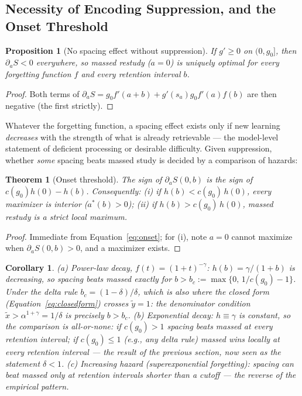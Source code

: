 \documentclass[man, 12pt, floatsintext]{apa6}
\newtheorem{theorem}{Theorem}
\newtheorem{proposition}{Proposition}
\newtheorem{corollary}{Corollary}
\theoremstyle{definition}
\theoremstyle{remark}
\begin{document}
\subsection{Necessity of Encoding Suppression, and the Onset Threshold}

\begin{proposition}[No spacing effect without suppression]\label{prop:suppression}
If $g' \geq 0$ on $(0, g_0]$, then $\partial_a S < 0$ everywhere, so massed restudy ($a=0$) is uniquely optimal for every forgetting function $f$ and every retention interval $b$.
\end{proposition}

\begin{proof}
Both terms of $\partial_a S = g_0 f'(a+b) + g'(s_a) g_0 f'(a) f(b)$ are then negative (the first strictly).
\end{proof}

Whatever the forgetting function, a spacing effect exists only if new learning \emph{decreases} with the strength of what is already retrievable --- the model-level statement of deficient processing or desirable difficulty. Given suppression, whether \emph{some} spacing beats massed study is decided by a comparison of hazards:

\begin{theorem}[Onset threshold]\label{thm:onset}
The sign of $\partial_a S(0,b)$ is the sign of $c(g_0) h(0) - h(b)$. Consequently:
(i) if $h(b) < c(g_0)\, h(0)$, every maximizer is interior ($a^*(b) > 0$);
(ii) if $h(b) > c(g_0)\, h(0)$, massed restudy is a strict local maximum.
\end{theorem}

\begin{proof}
Immediate from Equation~\ref{eq:onset}; for (i), note $a=0$ cannot maximize when $\partial_a S(0,b)>0$, and a maximizer exists.
\end{proof}

\begin{corollary}\label{cor:onset}
(a) \emph{Power-law decay}, $f(t)=(1+t)^{-\gamma}$: $h(b) = \gamma/(1+b)$ is decreasing, so spacing beats massed exactly for $b > b_c := \max\{0,\, 1/c(g_0) - 1\}$. Under the delta rule $b_c = (1-\delta)/\delta$, which is also where the closed form (Equation~\ref{eq:closedform}) crosses $\tilde y = 1$: the denominator condition $\tilde x > \alpha^{1+\gamma} = 1/\delta$ is precisely $b > b_c$.
(b) \emph{Exponential decay}: $h \equiv \gamma$ is constant, so the comparison is all-or-none: if $c(g_0) > 1$ spacing beats massed at every retention interval; if $c(g_0) \leq 1$ (e.g., any delta rule) massed wins locally at every retention interval --- the result of the previous section, now seen as the statement $\delta < 1$.
(c) \emph{Increasing hazard} (superexponential forgetting): spacing can beat massed only at retention intervals \emph{shorter} than a cutoff --- the reverse of the empirical pattern.
\end{corollary}
\end{document}
